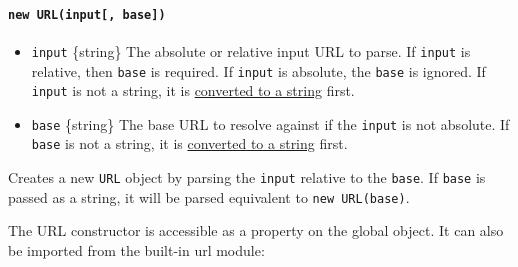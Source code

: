 \paragraph{\texorpdfstring{\texttt{new\ URL(input{[},\ base{]})}}{new URL(input{[}, base{]})}}\label{new-urlinput-base}

\begin{itemize}
\tightlist
\item
  \texttt{input} \{string\} The absolute or relative input URL to parse.
  If \texttt{input} is relative, then \texttt{base} is required. If
  \texttt{input} is absolute, the \texttt{base} is ignored. If
  \texttt{input} is not a string, it is
  \href{https://tc39.es/ecma262/\#sec-tostring}{converted to a string}
  first.
\item
  \texttt{base} \{string\} The base URL to resolve against if the
  \texttt{input} is not absolute. If \texttt{base} is not a string, it
  is \href{https://tc39.es/ecma262/\#sec-tostring}{converted to a
  string} first.
\end{itemize}

Creates a new \texttt{URL} object by parsing the \texttt{input} relative
to the \texttt{base}. If \texttt{base} is passed as a string, it will be
parsed equivalent to \texttt{new\ URL(base)}.

\begin{Shaded}
\begin{Highlighting}[]
\OperatorTok{=}  \NormalTok{(}\OperatorTok{,} \NormalTok{)}\OperatorTok{;}
\end{Highlighting}
\end{Shaded}

The URL constructor is accessible as a property on the global object. It
can also be imported from the built-in url module:

\begin{Shaded}
\begin{Highlighting}[]
 \OperatorTok{;}
\OperatorTok{===}\NormalTok{)}\OperatorTok{;} 
\end{Highlighting}
\end{Shaded}

